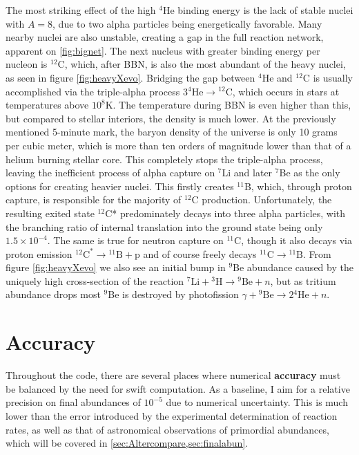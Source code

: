 The most striking effect of the high ${}^4$He binding energy is the lack of stable nuclei with $A=8$, due to two alpha particles being energetically favorable. Many nearby nuclei are also unstable, creating a gap in the full reaction network, apparent on \ref{fig:bignet}. The next nucleus with greater binding energy per nucleon is ${}^{12}$C, which, after BBN, is also the most abundant of the heavy nuclei, as seen in figure \ref{fig:heavyXevo}. Bridging the gap between ${}^4$He and ${}^{12}$C is usually accomplished via the triple-alpha process $3{}^4\text{He}\rightarrow {}^{12}\text{C}$, which occurs in stars at temperatures above $10^8$K. The temperature during BBN is even higher than this, but compared to stellar interiors, the density is much lower. At the previously mentioned 5-minute mark, the baryon density of the universe is only 10 grams per cubic meter, which is more than ten orders of magnitude lower than that of a helium burning stellar core. This completely stops the triple-alpha process, leaving the inefficient process of alpha capture on ${}^7$Li and later ${}^7$Be as the only options for creating heavier nuclei. This firstly creates ${}^{11}$B, which, through proton capture, is responsible for the majority of ${}^{12}$C production. Unfortunately, the resulting exited state ${}^{12}$C* predominately decays into three alpha particles, with the branching ratio of internal translation into the ground state being only $1.5\times 10^{-4}$. The same is true for neutron capture on ${}^{11}$C, though it also decays via proton emission  ${}^{12}\text{C}^\ast \rightarrow {}^{11}\text{B}+\text{p}$ and of course freely decays ${}^{11}\text{C}\rightarrow {}^{11}\text{B}$. From figure \ref{fig:heavyXevo} we also see an initial bump in ${}^9$Be abundance caused by the uniquely high cross-section of the reaction ${}^7\text{Li}+{}^3\text{H}\rightarrow {}^9\text{Be}+n$, but as tritium abundance drops most ${}^9$Be is destroyed by photofission $\gamma+{}^9\text{Be}\rightarrow 2{}^4\text{He}+n$.


\section{Accuracy}
\label{sec:Accuracy}
Throughout the code, there are several places where numerical \textbf{accuracy} must be balanced by the need for swift computation. As a baseline, I aim for a relative precision on final abundances of $10^{-5}$ due to numerical uncertainty. This is much lower than the error introduced by the experimental determination of reaction rates, as well as that of astronomical observations of primordial abundances, which will be covered in \cref{sec:Altercompare,sec:finalabun}.

